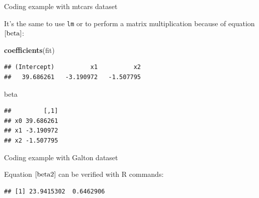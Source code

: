 \documentclass[ignorenonframetext,compress,aspectratio=169]{beamer}
\newenvironment{Shaded}{\begin{snugshade}}{\end{snugshade}}
\newcommand{\KeywordTok}[1]{\textcolor[rgb]{0.13,0.29,0.53}{\textbf{#1}}}
\newcommand{\StringTok}[1]{\textcolor[rgb]{0.31,0.60,0.02}{#1}}
\newcommand{\ControlFlowTok}[1]{\textcolor[rgb]{0.13,0.29,0.53}{\textbf{#1}}}
\newcommand{\OperatorTok}[1]{\textcolor[rgb]{0.81,0.36,0.00}{\textbf{#1}}}
\newcommand{\NormalTok}[1]{#1}
\begin{document}
\begin{frame}[fragile]{Coding example with mtcars dataset}

It's the same to use \texttt{lm} or to perform a matrix multiplication
because of equation \(\eqref{beta}\):

\begin{Shaded}
\begin{Highlighting}[]
\KeywordTok{coefficients}\NormalTok{(fit)}
\end{Highlighting}
\end{Shaded}

\begin{verbatim}
## (Intercept)          x1          x2 
##   39.686261   -3.190972   -1.507795
\end{verbatim}

\begin{Shaded}
\begin{Highlighting}[]
\NormalTok{beta}
\end{Highlighting}
\end{Shaded}

\begin{verbatim}
##         [,1]
## x0 39.686261
## x1 -3.190972
## x2 -1.507795
\end{verbatim}

\end{frame}

\begin{frame}[fragile]{Coding example with Galton dataset}

Equation \(\eqref{beta2}\) can be verified with R commands:

\begin{Shaded}
\end{Shaded}

\begin{verbatim}
## [1] 23.9415302  0.6462906
\end{verbatim}

\end{frame}
\end{document}
